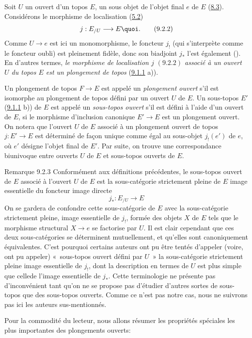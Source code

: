 \subsubsection{}

Soit $U$ un ouvert d'un topos $E$, \ie un sous objet de l'objet
final $e$ de $E$ (\hyperref[IV.def8.3]{8.3}). Considérons le morphisme de
localisation (\hyperref[IV.subsec5.2]{5.2})
\begin{equation*}
j:E_{/U}\longrightarrow E{\quoi}.\tag{9.2.2}
\end{equation*}
Comme $U\rightarrow e$ est ici un monomorphisme, le foncteur $j_{!}$
(qui s'interprète comme le foncteur oubli) est pleinement fidèle,
donc son biadjoint $j_\ast$ l'est également (). En d'autres
termes, \emph{le morphisme de localisation $j$ $(9.2.2)$ associé à
un ouvert $U$ du topos $E$ est un plongement de topos}
(\hyperref[IV.def9.1.1]{9.1.1} a)).

Un plongement de topos $F\rightarrow E$ est appelé un
\emph{plongement ouvert} s'il est isomorphe au plongement de topos
défini par un ouvert $U$ de $E$. Un sous-topos $E'$
(\hyperref[IV.def9.1.1]{9.1.1} b)) de $E$ est appelé un \emph{sous-topos ouvert}
s'il est défini à l'aide d'un ouvert de $E$, \ie si le morphisme
d'inclusion canonique $E'\rightarrow E$ est un plongement ouvert. On
notera que l'ouvert $U$ de $E$ associé à un plongement ouvert de
topos $j:E'\rightarrow E$ est déterminé de façon unique comme
égal au sous-objet $j_{!}(e')$ de $e$, où $e'$ désigne l'objet final
de $E'$. Par suite, on trouve une correspondance biunivoque entre
ouverts $U$ de $E$ et sous-topos ouverts de $E$.

\begin{enonce*}[remark]{Remarque 9.2.3}
Conformément aux définitions précédentes, le
sous-topos ouvert de
$E$ associé à l'ouvert $U$ de $E$ est la sous-catégorie strictement
pleine de $E$ image essentielle du foncteur image directe
$$
j_{\ast}:E_{/U}\longrightarrow E
$$
On se gardera de confondre cette sous-catégorie de $E$ avec la
sous-catégorie strictement pleine, image essentielle de $j_{!}$,
formée des objets $X$ de $E$ tels que le morphisme structural
$X\rightarrow e$ se factorise par $U$. Il est clair cependant que
ces deux sous-catégories se déterminent mutuellement, et qu'elles
sont canoniquement équivalentes. C'est pourquoi certains auteurs ont
pu être tentés d'appeler (voire, ont pu appeler) « sous-topos
ouvert défini par $U$ »  la sous-catégorie strictement pleine
image essentielle de $j_{!}$, dont la description en termes de $U$
est plus simple que celle\pageoriginale de l'image essentielle de
$j_{\ast}$. Cette terminologie ne présente pas d'inconvénient tant
qu'on ne se propose pas d'étudier d'autres sortes de sous-topos que
des sous-topos ouverts. Comme ce n'est pas notre cas, nous ne
suivrons pas ici les auteurs sus-mentionnés.

Pour la commodité du lecteur, nous allons résumer les propriétés
spéciales les plus importantes des plongements ouverts:
\end{enonce*}

